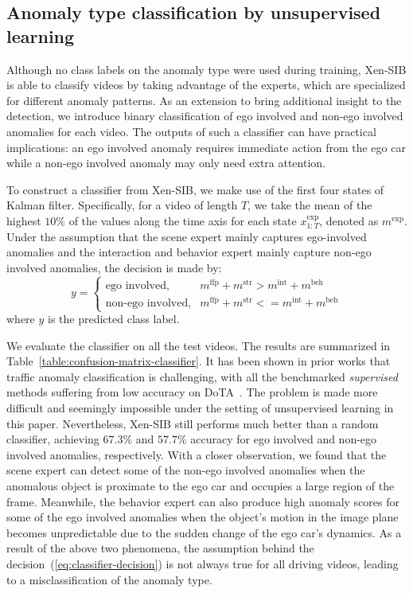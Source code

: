 \subsection{Anomaly type classification by unsupervised learning}
Although no class labels on the anomaly type were used during training, Xen-SIB is able to classify videos by taking advantage of the experts, which are specialized for different anomaly patterns. As an extension to bring additional insight to the detection, we introduce binary classification of ego involved and non-ego involved anomalies for each video. The outputs of such a classifier can have practical implications: an ego involved anomaly requires immediate action from the ego car while a non-ego involved anomaly may only need extra attention.

To construct a classifier from Xen-SIB, we make use of the first four states of Kalman filter. Specifically, for a video of length $T$, we take the mean of the highest $10\%$ of the values along the time axis for each state $x_{1:T}^\text{exp}$, denoted as $m^\text{exp}$. Under the assumption that the scene expert mainly captures ego-involved anomalies and the interaction and behavior expert mainly capture non-ego involved anomalies, the decision is made by:
\begin{equation}
\label{eq:classifier-decision}
y
=
\begin{cases}
\text{ego involved,} & m^\text{ffp} + m^\text{str} > m^\text{int} + m^\text{beh}\\
\text{non-ego involved,} & m^\text{ffp} + m^\text{str} <= m^\text{int} + m^\text{beh}
\end{cases}
\end{equation}
where $y$ is the predicted class label.

We evaluate the classifier on all the test videos. The results are summarized in Table~\ref{table:confusion-matrix-classifier}. It has been shown in prior works that traffic anomaly classification is challenging, with all the benchmarked \textit{supervised} methods suffering from low accuracy on DoTA~\citep{yao2022dota}. The problem is made more difficult and seemingly impossible under the setting of unsupervised learning in this paper. Nevertheless, Xen-SIB still performs much better than a random classifier, achieving $67.3\%$ and $57.7\%$ accuracy for ego involved and non-ego involved anomalies, respectively. With a closer observation, we found that the scene expert can detect some of the non-ego involved anomalies when the anomalous object is proximate to the ego car and occupies a large region of the frame. Meanwhile, the behavior expert can also produce high anomaly scores for some of the ego involved anomalies when the object's motion in the image plane becomes unpredictable due to the sudden change of the ego car's dynamics. As a result of the above two phenomena, the assumption behind the decision~(\ref{eq:classifier-decision}) is not always true for all driving videos, leading to a misclassification of the anomaly type.

